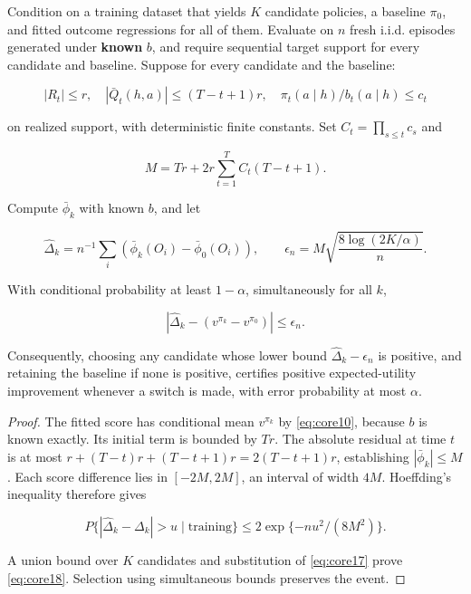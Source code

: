 \begin{theorem}\label{core-result-5}
Condition on a training dataset that yields \(K\) candidate policies, a baseline \(\pi_0\), and fitted outcome regressions for all of them. Evaluate on \(n\) fresh i.i.d. episodes generated under \textbf{known} \(b\), and require sequential target support for every candidate and baseline. Suppose for every candidate and the baseline:

\[
|R_t|\le r,\quad
|\bar Q_t(h,a)|\le (T-t+1)r,\quad
\pi_t(a\mid h)/b_t(a\mid h)\le c_t
\]

on realized support, with deterministic finite constants. Set \(C_t=\prod_{s\le t}c_s\) and

\begin{equation}\label{eq:core16}
M=Tr+2r\sum_{t=1}^{T}C_t(T-t+1).
\end{equation}

Compute \(\bar\phi_k\) with known \(b\), and let

\begin{equation}\label{eq:core17}
\widehat\Delta_k=n^{-1}\sum_i(\bar\phi_k(O_i)-\bar\phi_0(O_i)),
\qquad
\epsilon_n=M\sqrt{\frac{8\log(2K/\alpha)}{n}}.
\end{equation}

With conditional probability at least \(1-\alpha\), simultaneously for all \(k\),

\begin{equation}\label{eq:core18}
|\widehat\Delta_k-(v^{\pi_k}-v^{\pi_0})|\le\epsilon_n.
\end{equation}

Consequently, choosing any candidate whose lower bound \(\widehat\Delta_k-\epsilon_n\) is positive, and retaining the baseline if none is positive, certifies positive expected-utility improvement whenever a switch is made, with error probability at most \(\alpha\).
\end{theorem}
\begin{proof}
The fitted score has conditional mean \(v^{\pi_k}\) by \eqref{eq:core10}, because \(b\) is known exactly. Its initial term is bounded by \(Tr\). The absolute residual at time \(t\) is at most \(r+(T-t)r+(T-t+1)r=2(T-t+1)r\), establishing \(|\bar\phi_k|\le M\). Each score difference lies in \([-2M,2M]\), an interval of width \(4M\). Hoeffding's inequality therefore gives

\[
P\{|\widehat\Delta_k-\Delta_k|>u\mid\mathrm{training}\}
\le2\exp\{-nu^2/(8M^2)\}.
\]

A union bound over \(K\) candidates and substitution of \eqref{eq:core17} prove \eqref{eq:core18}. Selection using simultaneous bounds preserves the event.
\end{proof}

